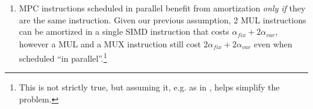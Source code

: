\begin{enumerate}
\item MPC instructions scheduled in parallel benefit from amortization \emph{only if} they are the same instruction. Given our previous assumption,
2 MUL instructions can be amortized in a single SIMD instruction that costs $\alpha_\mathit{fix} + 2\alpha_\mathit{var}$, however a MUL and a MUX instruction
still cost $2\alpha_\mathit{fix} + 2\alpha_\mathit{var}$ even when scheduled ``in parallel''.\footnote{This is not strictly true, but assuming it, e.g. as in 
\cite{Ishaq2019, Demmler2015ABYA, Mohassel2018}, helps simplify the problem.}
\end{enumerate}


